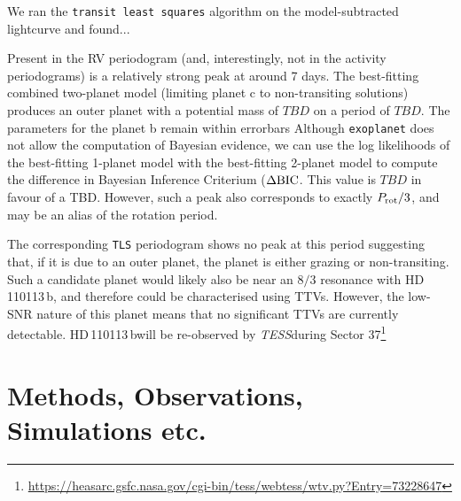 \documentclass[fleqn,usenatbib]{mnras}
\newcommand{\tess}{{\it TESS}}
\newcommand{\Tplanet}{HD\,110113\,b}
\begin{document}
We ran the \texttt{transit least squares} algorithm \citep{heller} on the model-subtracted lightcurve and found...

Present in the RV periodogram (and, interestingly, not in the activity periodograms) is a relatively strong peak at around 7 days.
The best-fitting combined two-planet model (limiting planet c to non-transiting solutions) produces an outer planet with a potential mass of $TBD$ on a period of $TBD$.
The parameters for the planet b remain within errorbars 
Although \texttt{exoplanet} does not allow the computation of Bayesian evidence, we can use the log likelihoods of the best-fitting 1-planet model with the best-fitting 2-planet model to compute the difference in Bayesian Inference Criterium ($\Delta{\rm BIC}$.
This value is $TBD$ in favour of a TBD.
However, such a peak also corresponds to exactly $P_{\rm rot}/3$, and may be an alias of the rotation period.

The corresponding \texttt{TLS} periodogram shows no peak at this period suggesting that, if it is due to an outer planet, the planet is either grazing or non-transiting.
Such a candidate planet would likely also be near an $8/3$ resonance with \Tplanet, and therefore could be characterised using TTVs. 
However, the low-SNR nature of this planet means that no significant TTVs are currently detectable.
\Tplanet will be re-observed by \tess during Sector 37\footnote{\url{https://heasarc.gsfc.nasa.gov/cgi-bin/tess/webtess/wtv.py?Entry=73228647}}

\section{Methods, Observations, Simulations etc.}
\end{document}
